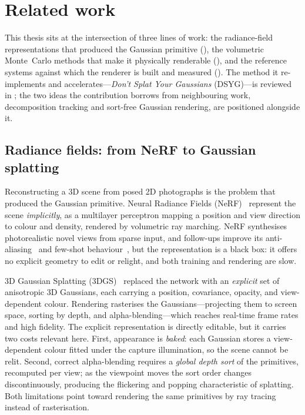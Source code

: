 \chapter{Related work}
\label{ch:related-work}

This thesis sits at the intersection of three lines of work: the radiance-field representations that
produced the Gaussian primitive (), the volumetric Monte~Carlo methods
that make it physically renderable (), and the reference systems against
which the renderer is built and measured (). The method it
re-implements and accelerates---\emph{Don't Splat Your Gaussians} (DSYG)---is reviewed in
; the two ideas the contribution borrows from neighbouring work, decomposition
tracking and sort-free Gaussian rendering, are positioned alongside it.

\section{Radiance fields: from NeRF to Gaussian splatting}
\label{sec:radiance-fields}

Reconstructing a 3D scene from posed 2D photographs is the problem that produced the Gaussian
primitive. Neural Radiance Fields (NeRF)~\cite{NeRF} represent the scene \emph{implicitly}, as a
multilayer perceptron mapping a position and view direction to colour and density, rendered by
volumetric ray marching. NeRF synthesises photorealistic novel views from sparse input, and
follow-ups improve its anti-aliasing~\cite{MipNeRF} and few-shot behaviour~\cite{PixelNeRF}, but the
representation is a black box: it offers no explicit geometry to edit or relight, and both training
and rendering are slow.

3D Gaussian Splatting (3DGS)~\cite{3DGS} replaced the network with an \emph{explicit} set of
anisotropic 3D Gaussians, each carrying a position, covariance, opacity, and view-dependent colour.
Rendering rasterises the Gaussians---projecting them to screen space, sorting by depth, and
alpha-blending---which reaches real-time frame rates and high fidelity. The explicit representation
is directly editable, but it carries two costs relevant here. First, appearance is \emph{baked}: each
Gaussian stores a view-dependent colour fitted under the capture illumination, so the scene cannot be
relit. Second, correct alpha-blending requires a \emph{global depth sort} of the primitives, recomputed
per view; as the viewpoint moves the sort order changes discontinuously, producing the flickering and
popping characteristic of splatting. Both limitations point toward rendering the
same primitives by ray tracing instead of rasterisation.

